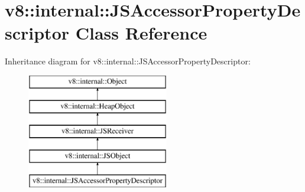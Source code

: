 \hypertarget{classv8_1_1internal_1_1_j_s_accessor_property_descriptor}{}\section{v8\+:\+:internal\+:\+:J\+S\+Accessor\+Property\+Descriptor Class Reference}
\label{classv8_1_1internal_1_1_j_s_accessor_property_descriptor}
Inheritance diagram for v8\+:\+:internal\+:\+:J\+S\+Accessor\+Property\+Descriptor\+:\begin{figure}[H]
\begin{center}
\leavevmode
\includegraphics[height=5.000000cm]{classv8_1_1internal_1_1_j_s_accessor_property_descriptor}
\end{center}
\end{figure}
